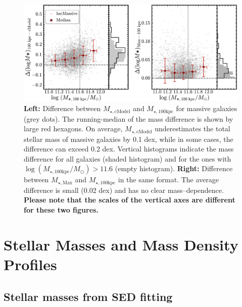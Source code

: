 \documentclass[fleqn,usenatbib]{mnras}
\def\mtot{{$M_{\star,100\mathrm{kpc}}$}}
\def\mmax{{$M_{\star,\mathrm{Max}}$}}
\def\mcmodel{{$M_{\star,\mathrm{cModel}}$}}
\def\logmtot{{$\log (M_{\star,100\mathrm{kpc}}/M_{\odot})$}}
\begin{document}
  \begin{figure}
      \centering 
      \includegraphics[width=\textwidth]{fig/redbcg_mass_diff_new}
      \caption{              
          \textbf{Left:} Difference between \mcmodel{} and \mtot{} for massive
      	  galaxies (grey dots).
      	  The running-median of the mass difference is shown by large red hexagons. 
      	  On average, \mcmodel{} underestimates the total stellar mass of massive 
          galaxies by 0.1 dex, while in some cases, the difference can exceed 0.2 dex.
          Vertical histograms indicate the mass difference for all galaxies (shaded 
          histogram) and for the ones with \logmtot{}$>11.6$ (empty histogram).
          \textbf{Right:} Difference between \mmax{} and \mtot{} in the same format. 
          The average difference is small (0.02 dex) and has no clear mass--dependence. 
          \textbf{Please note that the scales of the vertical axes are different 
            for these two figures.}
          }
      \label{fig:mass_diff}
  \end{figure}
          
    
\section{Stellar Masses and Mass Density Profiles}
    \label{sec:mstar}
    
\subsection{Stellar masses from SED fitting}
    \label{ssec:isedfit}
   
\end{document}
